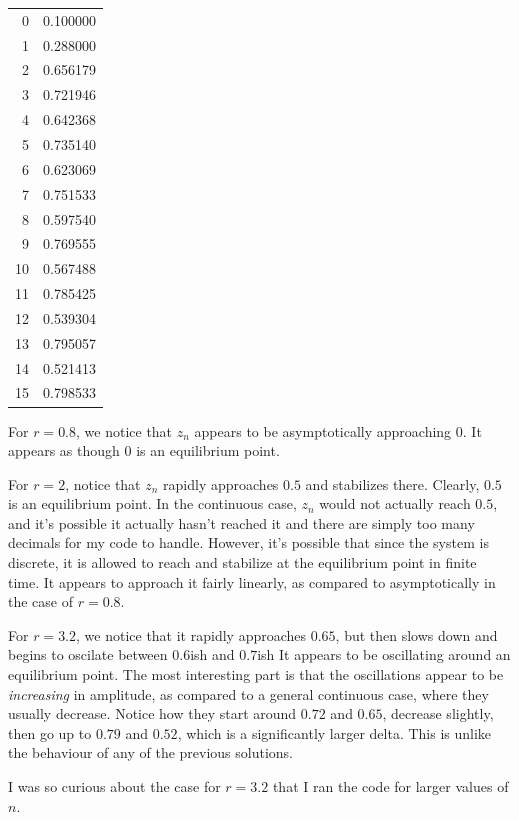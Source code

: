 \documentclass[11pt, letterpaper]{report}
\begin{document}
\begin{center}
\begin{tabular}{rr}
\midrule
0 & 0.100000 \\
1 & 0.288000 \\
2 & 0.656179 \\
3 & 0.721946 \\
4 & 0.642368 \\
5 & 0.735140 \\
6 & 0.623069 \\
7 & 0.751533 \\
8 & 0.597540 \\
9 & 0.769555 \\
10 & 0.567488 \\
11 & 0.785425 \\
12 & 0.539304 \\
13 & 0.795057 \\
14 & 0.521413 \\
15 & 0.798533 \\
\bottomrule
\end{tabular}
\end{center}
For $r=0.8$, we notice that $z_n$ appears to be asymptotically approaching $0$. It appears as though $0$ is an equilibrium point.

For $r=2$, notice that $z_n$ rapidly approaches $0.5$ and stabilizes there. Clearly, $0.5$ is an equilibrium point. In the continuous case, $z_n$ would not actually reach $0.5$, and it's possible it actually hasn't reached it and there are simply too many decimals for my code to handle. However, it's possible that since the system is discrete, it is allowed to reach and stabilize at the equilibrium point in finite time. It appears to approach it fairly linearly, as compared to asymptotically in the case of $r=0.8$.

For $r=3.2$, we notice that it rapidly approaches $0.65$, but then slows down and begins to oscilate between $0.6$ish and $0.7$ish It appears to be oscillating around an equilibrium point. The most interesting part is that the oscillations appear to be \emph{increasing} in amplitude, as compared to a general continuous case, where they usually decrease. Notice how they start around $0.72$ and $0.65$, decrease slightly, then go up to $0.79$ and $0.52$, which is a significantly larger delta. This is unlike the behaviour of any of the previous solutions.

I was so curious about the case for $r=3.2$ that I ran the code for larger values of $n$.
\end{document}
